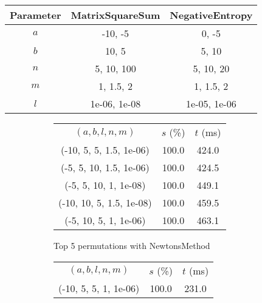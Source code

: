 \begin{center}
\label{tab:params_UniformSearch}
\begin{tabular}{|c|c|c|}
\hline
\rowcolor{gray!25}
Parameter & MatrixSquareSum & NegativeEntropy \\
\hline
$a$ & -10, -5 & 0, -5 \\
$b$ & 10, 5 & 5, 10 \\
$n$ & 5, 10, 100 & 5, 10, 20 \\
$m$ & 1, 1.5, 2 & 1, 1.5, 2 \\
$l$ & 1e-06, 1e-08 & 1e-05, 1e-06 \\
\hline
\end{tabular}
\end{center}

\begin{figure}[H]
\label{fig:param_comp_MatrixSquareSum_UniformSearch}
\begin{subfigure}[ht]{.5\textwidth}
\begin{tabular}{|c|c|c|}
\hline
\rowcolor{gray!25}
\multicolumn{3}{|c|}{NewtonsMethod} \\
\hline
\rowcolor{gray!25}
$(a,b,l,n,m)$ & $s$ (\%) & $t$ (ms) \\
\hline
(-10, 5, 5, 1.5, 1e-06) & 100.0 & 424.0 \\
(-5, 5, 10, 1.5, 1e-06) & 100.0 & 424.5 \\
(-5, 5, 10, 1, 1e-08) & 100.0 & 449.1 \\
(-10, 10, 5, 1.5, 1e-08) & 100.0 & 459.5 \\
(-5, 10, 5, 1, 1e-06) & 100.0 & 463.1 \\
\hline
\end{tabular}
\caption{Top 5 permutations with NewtonsMethod}
\label{subfig:param_comp_MatrixSquareSum_NewtonsMethod_UniformSearch}
\end{subfigure}
\hfill
\begin{subfigure}[ht]{.5\textwidth}
\begin{tabular}{|c|c|c|}
\hline
\rowcolor{gray!25}
\multicolumn{3}{|c|}{GradientDescentMethod} \\
\hline
\rowcolor{gray!25}
$(a,b,l,n,m)$ & $s$ (\%) & $t$ (ms) \\
\hline
(-10, 5, 5, 1, 1e-06) & 100.0 & 231.0 \\

\end{tabular}
\end{subfigure}
\end{figure}
